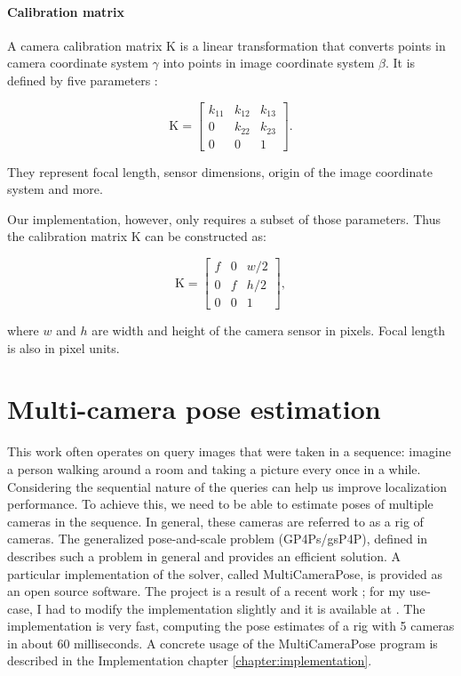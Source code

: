 \documentclass[twoside]{ctuthesis}
\theoremstyle{plain}
\theoremstyle{definition}
\theoremstyle{note}
\begin{document}
\paragraph{Calibration matrix}
A camera calibration matrix K is a linear transformation that converts points in camera coordinate system $\gamma$ into points in image coordinate system $\beta$. It is defined by five parameters \cite{GVG}:

\begin{equation}
	\text{K} = \begin{bmatrix}
		k_{11} & k_{12} & k_{13} \\
		0 & k_{22} & k_{23} \\
		0 & 0 & 1
		\end{bmatrix}.
\end{equation}

They represent focal length, sensor dimensions, origin of the image coordinate system and more.

Our implementation, however, only requires a subset of those parameters. Thus the calibration matrix K can be constructed as:

\begin{equation}
	\text{K} = \begin{bmatrix}
		f & 0 & w/2 \\
		0 & f & h/2 \\
		0 & 0 & 1
		\end{bmatrix},
\end{equation}

where $w$ and $h$ are width and height of the camera sensor in pixels. Focal length is also in pixel units.

\section{Multi-camera pose estimation}

This work often operates on query images that were taken in a sequence: imagine a person walking around a room and taking a picture every once in a while. Considering the sequential nature of the queries can help us improve localization performance. To achieve this, we need to be able to estimate poses of multiple cameras in the sequence. In general, these cameras are referred to as a rig of cameras. The generalized pose-and-scale problem (GP4Ps/gsP4P), defined in \cite{Kukelova2016CVPR} describes such a problem in general and provides an efficient solution. A particular implementation of the solver, called MultiCameraPose, is provided as an open source software. The project is a result of a recent work \cite{MultiCameraPosePaper}; for my use-case, I had to modify the implementation slightly and it is available at \cite{MultiCameraPose}. The implementation is very fast, computing the pose estimates of a rig with 5 cameras in about 60 milliseconds. A concrete usage of the MultiCameraPose program is described in the Implementation chapter \ref{chapter:implementation}.
\end{document}
